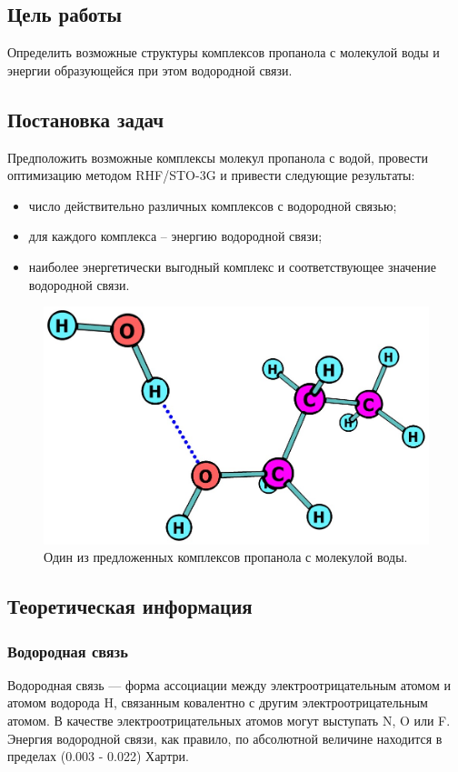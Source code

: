 \subsection{Цель работы}
Определить возможные структуры комплексов пропанола с молекулой воды и энергии образующейся при этом водородной связи.


\subsection{Постановка задач}
Предположить возможные комплексы молекул пропанола с водой, провести оптимизацию методом RHF/STO-3G и привести следующие результаты: 
\begin{itemize}
    \item число действительно различных комплексов с водородной связью;
    \item для каждого комплекса -- энергию водородной связи;
    \item наиболее энергетически выгодный комплекс и соответствующее значение водородной связи.
\end{itemize}

\begin{figure}[H]
\centering
\captionsetup{justification=centering}
\includegraphics[scale=0.4]{fig/0.jpg}
\caption{Один из предложенных комплексов пропанола с молекулой воды.}
\end{figure}


\subsection{Теоретическая информация}
\subsubsection{Водородная связь}
Водородная связь — форма ассоциации между электроотрицательным атомом и атомом водорода H, связанным ковалентно с другим электроотрицательным атомом. В качестве электроотрицательных атомов могут выступать N, O или F. Энергия водородной связи, как правило, по абсолютной величине находится в пределах (0.003 - 0.022) Хартри.

